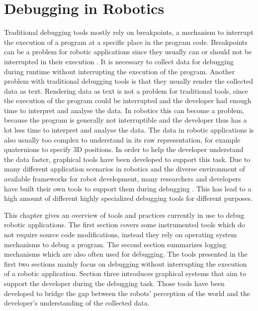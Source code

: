 \chapter{Debugging in Robotics}
\label{debugging_in_robotics}

Traditional debugging tools mostly rely on breakpoints, a mechanism to interrupt the execution of a program at a specific place in the program code. Breakpoints can be a problem for robotic applications since they usually can or should not be interrupted in their execution \cite{Gumbley2009}. It is necessary to collect data for debugging during runtime without interrupting the execution of the program.
Another problem with traditional debugging tools is that they usually render the collected data as text. Rendering data as text is not a problem for traditional tools, since the execution of the program could be interrupted and the developer had enough time to interpret and analyse the data. In robotics this can become a problem, because the program is generally not interruptible and the developer thus has a lot less time to interpret and analyse the data. The data in robotic applications is also usually too complex to understand in its raw representation, for example quaternions to specify 3D positions. In order to help the developer understand the data faster, graphical tools have been developed to support this task. Due to many different application scenarios in robotics and the diverse environment of available frameworks for robot development, many researchers and developers have built their own tools to support them during debugging \cite{Collett2010}. This has lead to a high amount of different highly specialized debugging tools for different purposes.

This chapter gives an overview of tools and practices currently in use to debug robotic applications. The first section covers some instrumented tools which do not require source code modifications, instead they rely on operating system mechanisms to debug a program. The second section summarizes logging mechanisms which are also often used for debugging. The tools presented in the first two sections mainly focus on debugging without interrupting the execution of a robotic application. Section three introduces graphical systems that aim to support the developer during the debugging task. Those tools have been developed to bridge the gap between the robots' perception of the world and the developer's understanding of the collected data.


